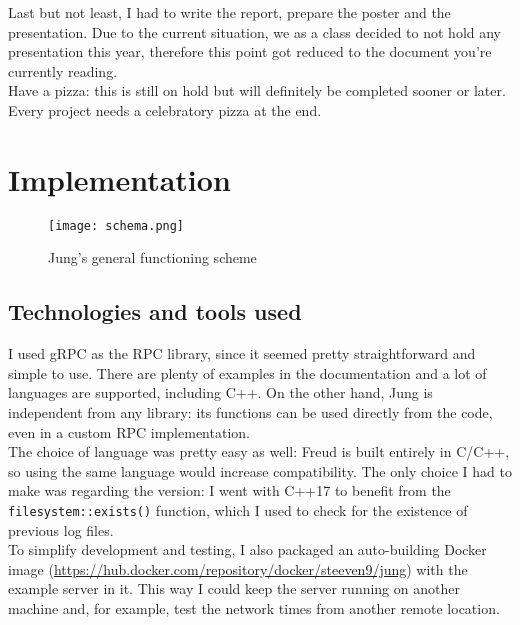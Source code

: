         Last but not least, I had to write the report, prepare the poster and the presentation. Due to the current
        situation, we as a class decided to not hold any presentation this year, therefore this point got reduced
        to the document you're currently reading.\\
        
        Have a pizza: this is still on hold but will definitely be completed sooner or later. Every project needs
        a celebratory pizza at the end.
        

\chapter{Implementation}

    \begin{figure}[H]
        \centering
        \texttt{[image: schema.png]}
        \caption{Jung's general functioning scheme}
        \label{fig:schema}
    \end{figure}
    

    \section{Technologies and tools used}

        I used gRPC \cite{gRPCdocs} as the RPC library, since it seemed pretty straightforward and simple
        to use. There are plenty of examples in the documentation and a lot of languages are supported,
        including C++. On the other hand, Jung is independent from any library:
        its functions can be used directly from the code, even in a custom RPC implementation.\\

        The choice of language was pretty easy as well: Freud is built entirely in C/C++, so using the same
        language would increase compatibility. The only choice I had to make was regarding the version:
        I went with C++17 to benefit from the \texttt{filesystem::exists()} function, which I used to check
        for the existence of previous log files.\\

        To simplify development and testing, I also packaged an auto-building Docker image 
        (\url{https://hub.docker.com/repository/docker/steeven9/jung}) with the example server in it.
        This way I could keep the server running on another machine and, for example, test the network times
        from another remote location.


